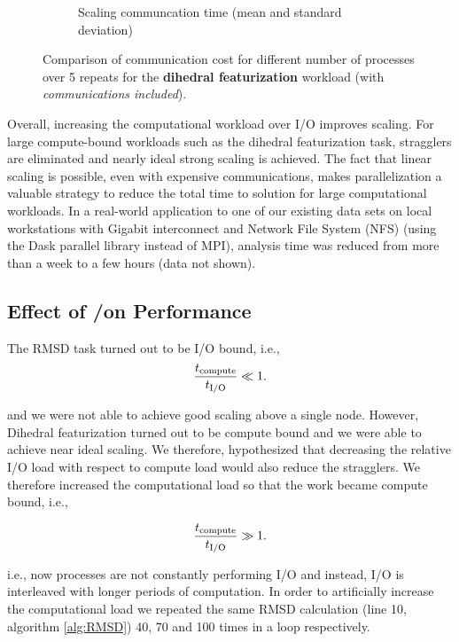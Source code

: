 \begin{figure}[ht!]
\begin{subfigure}{.35\textwidth}
  \caption{Scaling communcation time (mean and standard deviation)}
\end{subfigure}
\caption{Comparison of communication cost for different number of
  processes over 5 repeats for the \textbf{dihedral featurization}
  workload (with \emph{communications included}).}
\label{fig:comparison-t_comm-dihedral}
\end{figure}

Overall, increasing the computational workload over I/O improves scaling. For large compute-bound workloads such as the dihedral
featurization task, stragglers are eliminated and nearly ideal strong scaling is achieved. 
The fact that linear scaling is possible, even with expensive communications, makes parallelization a valuable strategy to reduce
the total time to solution for large computational workloads. In a real-world application to one of our existing data sets on local
workstations with Gigabit interconnect and Network File System (NFS) (using the Dask parallel library instead of MPI), analysis time was reduced from more
than a week to a few hours (data not shown).

\subsection{Effect of \tcomp/\tIO on Performance}
\label{bound}

The RMSD task turned out to be I/O bound, i.e.,
\begin{gather*}
  \frac{{t}_{\text{compute}}}{{t}_{\text{I/O}}} \ll 1.
\end{gather*}

and we were not able to achieve good scaling above a single node. 
However, Dihedral featurization turned out to be compute bound and we were able to achieve near ideal scaling. 
We therefore, hypothesized that decreasing the relative I/O load with respect to compute load would also reduce the stragglers. 
We therefore increased the computational load so that the work became compute bound, i.e.,

\begin{gather*}
  \frac{{t}_{\text{compute}}}{{t}_{\text{I/O}}} \gg 1.
\end{gather*}

i.e., now processes are not constantly performing I/O and instead, I/O is interleaved with longer periods of computation.
In order to artificially increase the computational load we repeated the same RMSD calculation (line 10, algorithm \ref{alg:RMSD}) 40, 70 and 100 times in a loop respectively.

